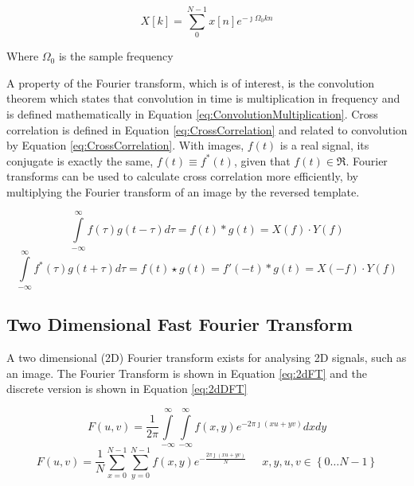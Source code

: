 \begin{equation}\label{eq:DFT}
X[k] = \sum\limits_{0}^{N-1}x[n]e^{-\jmath \Omega_0 kn}
\end{equation}
\begin{center}
Where $\Omega_0$ is the sample frequency
\end{center}

A property of the Fourier transform, which is of interest, is the convolution theorem which states that convolution in time is multiplication in frequency and is defined mathematically in Equation \eqref{eq:ConvolutionMultiplication}. Cross correlation is defined in Equation \eqref{eq:CrossCorrelation} and related to convolution by Equation \eqref{eq:CrossCorrelation}. With images, $f(t)$ is a real signal, its conjugate is exactly the same, $f(t) \equiv f^*(t)$, given that $f(t) \in \Re$. Fourier transforms can be used to calculate cross correlation more efficiently, by multiplying the Fourier transform of an image by the reversed template.%


\begin{equation}\label{eq:ConvolutionMultiplication}
\int\limits_{-\infty}^{\infty}f(\tau)g(t-\tau)d\tau = f(t) \ast g(t) = X(f)\cdot Y(f)
\end{equation}
\begin{equation}\label{eq:CrossCorrelation}
\int\limits_{-\infty}^{\infty}f^*(\tau)g(t+\tau)d\tau = f(t) \star g(t) = f'(-t) \ast g(t) = X(-f)\cdot Y(f)
\end{equation}


\subsection{Two Dimensional Fast Fourier Transform}
A two dimensional (2D) Fourier transform exists for analysing 2D signals, such as an image. The Fourier Transform is shown in Equation \eqref{eq:2dFT} and the discrete version is shown in Equation \eqref{eq:2dDFT}

\begin{equation}\label{eq:2dFT}
F(u,v) = \frac{1}{2\pi}\int\limits_{-\infty}^{\infty}\int\limits_{-\infty}^{\infty}f(x,y)e^{-2\pi\jmath (xu+yv)}dxdy
\end{equation}
\begin{equation}\label{eq:2dDFT}
F(u,v) = \frac{1}{N} \sum\limits_{x=0}^{N-1}\sum\limits_{y=0}^{N-1}f(x,y)e^{-\frac{2\pi\jmath (xu+yv)}{N}} \; \; \; \; \; x,y,u,v \in \left\lbrace 0\dots N-1\right\rbrace
\end{equation}

